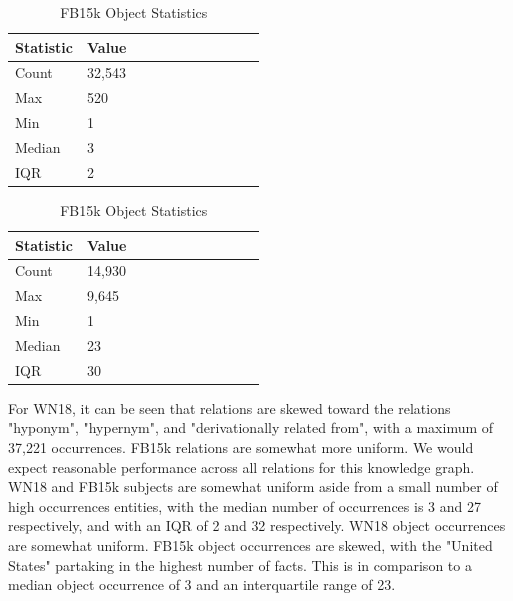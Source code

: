 \begin{table}[H]
	\parbox{.5\linewidth}{
		\caption{WN18 Object Statistics}
		\centering
		\begin{tabular}{lllllllllll}
  			\textbf{Statistic} & \textbf{Value}  \\
  			\hline
			Count & 32,543 \\
			Max & 520 \\
			Min & 1 \\
  			Median & 3 \\
  			IQR & 2 \\
		\end{tabular}
		}
	\hfill
	\parbox{.5\linewidth}{
		\caption{FB15k Object Statistics}
		\centering
		\begin{tabular}{lllllllllll}
  			\textbf{Statistic} & \textbf{Value}  \\
  			\hline
			Count & 14,930 \\
			Max & 9,645 \\
			Min & 1 \\
  			Median & 23 \\
  			IQR & 30 \\
		\end{tabular}
		}
\end{table}

For WN18, it can be seen that relations are skewed toward the relations "hyponym",  "hypernym", and "derivationally related from", with a maximum of 37,221 occurrences. \newline
FB15k relations are somewhat more uniform. We would expect reasonable performance across all relations for this knowledge graph. \newline
WN18 and FB15k subjects are somewhat uniform aside from a small number of high occurrences entities, with the median number of occurrences is 3 and 27 respectively, and with an IQR of 2 and 32 respectively. 
WN18 object occurrences are somewhat uniform. FB15k object occurrences are skewed, with the "United States" partaking in the highest number of facts. This is in comparison to a median object occurrence of 3 and an interquartile range of 23.


